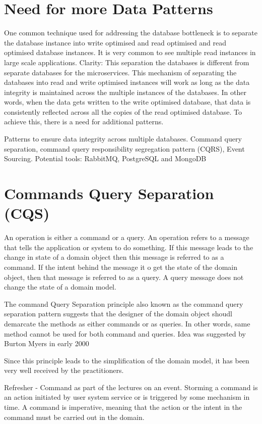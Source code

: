 

\section{Need for more Data Patterns}
One common technique used for addressing the database bottleneck is to separate the database instance into write optimised and read optimised and read optimised database instances.
It is very common to see multiple read instances in large scale applications.
Clarity: This separation the databases is different from separate databases for the microservices.
This mechanism of separating the databases into read and write optimised instances will work as long as the data integrity is maintained across the multiple instances of the databases.
In other words, when the data gets written to the write optimised database, that data is consistently reflected across all the copies of the read optimised database.
To achieve this, there is a need for additional patterns.

Patterns to ensure data integrity across multiple databases.
Command query separation, command query responsibility segregation pattern (CQRS), Event Sourcing.
Potential tools: RabbitMQ, PostgreSQL and MongoDB


\section{Commands Query Separation (CQS)}
An operation is either a command or a query.
An operation refers to a message that tells the application or system to do something.
If this message leads to the change in state of a domain object then this message is referred to as a command.
If the intent behind the message it o get the state of the domain object, then that message is referred to as a query.
A query message does not change the state of a domain model.

The command Query Separation principle also known as the command query separation pattern suggests that the designer of the domain object shoudl demarcate the methods as either commands or as queries.
In other words, same method cannot be used for both command and queries.
Idea was suggested by Burton Myers in early 2000

Since this principle leads to the simplification of the domain model, it has been very well received by the practitioners.

Refresher - Command as part of the lectures on an event.
Storming a command is an action initiated by user system service or is triggered by some mechanism in time.
A command is imperative, meaning that the action or the intent in the command must be carried out in the domain.

